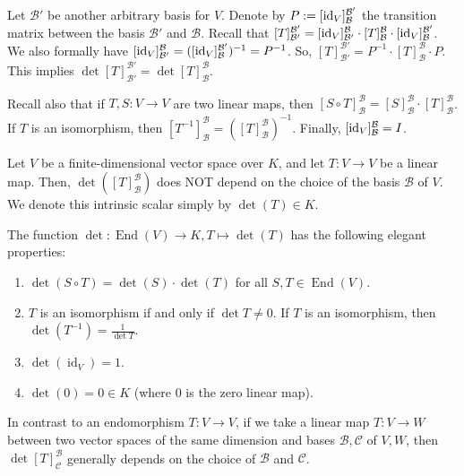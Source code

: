 \begin{answer} Let $\mathcal{B}'$ be another arbitrary basis for $V$. Denote by $P := [\operatorname{id}_V]_{\mathcal{B}}^{\mathcal{B}'}$ the transition matrix between the basis $\mathcal{B}'$ and $\mathcal{B}$. Recall that $[T]_{\mathcal{B}'}^{\mathcal{B}'} = [\operatorname{id}_V]_{\mathcal{B}'}^{\mathcal{B}} \cdot [T]_{\mathcal{B}}^{\mathcal{B}} \cdot [\operatorname{id}_V]_{\mathcal{B}}^{\mathcal{B}'}$.
  We also formally have $[\operatorname{id}_V]_{\mathcal{B}'}^{\mathcal{B}} = ([\operatorname{id}_V]_{\mathcal{B}}^{\mathcal{B}'})^{-1} = P^{-1}$.
  So, $[T]_{\mathcal{B}'}^{\mathcal{B}'} = P^{-1} \cdot [T]_{\mathcal{B}}^{\mathcal{B}} \cdot P$. This implies $\det [T]_{\mathcal{B}'}^{\mathcal{B}'} = \det [T]_{\mathcal{B}}^{\mathcal{B}}$.

  Recall also that if $T, S : V \to V$ are two linear maps, then $[S \circ T]_{\mathcal{B}}^{\mathcal{B}} = [S]_{\mathcal{B}}^{\mathcal{B}} \cdot [T]_{\mathcal{B}}^{\mathcal{B}}$. If $T$ is an isomorphism, then $[T^{-1}]_{\mathcal{B}}^{\mathcal{B}} = ([T]_{\mathcal{B}}^{\mathcal{B}})^{-1}$. Finally, $[\operatorname{id}_V]_{\mathcal{B}}^{\mathcal{B}} = I$.
\end{answer}

\begin{corollary}
  \label{cor:det_endomorphism}
  Let $V$ be a finite-di\-men\-sional vector space over $K$, and let $T : V \to V$ be a linear map. Then, $\det([T]_{\mathcal{B}}^{\mathcal{B}})$ does NOT depend on the choice of the basis $\mathcal{B}$ of $V$. We denote this intrinsic scalar simply by $\det(T) \in K$.
\end{corollary}

The function $\det : \operatorname{End}(V) \to K, T \mapsto \det(T)$ has the following elegant properties:
\begin{enumerate}
  \item $\det(S \circ T) = \det(S) \cdot \det(T)$ for all $S, T \in \operatorname{End}(V)$.
  \item $T$ is an isomorphism if and only if $\det T \neq 0$. If $T$ is an isomorphism, then $\det(T^{-1}) = \frac{1}{\det T}$.
  \item $\det(\operatorname{id}_V) = 1$.
  \item $\det(0) = 0 \in K$ (where $0$ is the zero linear map).
\end{enumerate}

\begin{importantremark}
  In contrast to an endomorphism $T : V \to V$, if we take a linear map $T : V \to W$ between two vector spaces of the same dimension and bases $\mathcal{B}, \mathcal{C}$ of $V, W$, then $\det[T]_{\mathcal{C}}^{\mathcal{B}}$ generally depends on the choice of $\mathcal{B}$ and $\mathcal{C}$.
\end{importantremark}